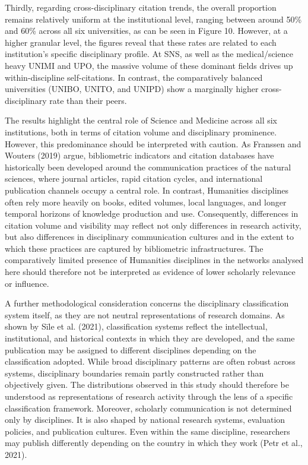 \documentclass[year=2026]{cup-journal}
\begin{document}
Thirdly, regarding cross-disciplinary citation trends, the overall proportion remains relatively uniform at the institutional level, ranging between around 50\% and 60\% across all six universities, as can be seen in Figure 10. However, at a higher granular level, the figures reveal that these rates are related to each institution's specific disciplinary profile. At SNS, as well as the medical/science heavy UNIMI and UPO, the massive volume of these dominant fields drives up within-discipline self-citations. In contrast, the comparatively balanced universities (UNIBO, UNITO, and UNIPD) show a marginally higher cross-disciplinary rate than their peers. 

The results highlight the central role of Science and Medicine across all six institutions, both in terms of citation volume and disciplinary prominence. However, this predominance should be interpreted with caution. As Franssen and Wouters (2019) argue, bibliometric indicators and citation databases have historically been developed around the communication practices of the natural sciences, where journal articles, rapid citation cycles, and international publication channels occupy a central role. In contrast, Humanities disciplines often rely more heavily on books, edited volumes, local languages, and longer temporal horizons of knowledge production and use. Consequently, differences in citation volume and visibility may reflect not only differences in research activity, but also differences in disciplinary communication cultures and in the extent to which these practices are captured by bibliometric infrastructures. The comparatively limited presence of Humanities disciplines in the networks analysed here should therefore not be interpreted as evidence of lower scholarly relevance or influence.

A further methodological consideration concerns the disciplinary classification system itself, as they are not neutral representations of research domains. As shown by Sīle et al. (2021), classification systems reflect the intellectual, institutional, and historical contexts in which they are developed, and the same publication may be assigned to different disciplines depending on the classification adopted. While broad disciplinary patterns are often robust across systems, disciplinary boundaries remain partly constructed rather than objectively given. The distributions observed in this study should therefore be understood as representations of research activity through the lens of a specific classification framework. Moreover, scholarly communication is not determined only by disciplines. It is also shaped by national research systems, evaluation policies, and publication cultures. Even within the same discipline, researchers may publish differently depending on the country in which they work (Petr et al., 2021).
\end{document}
